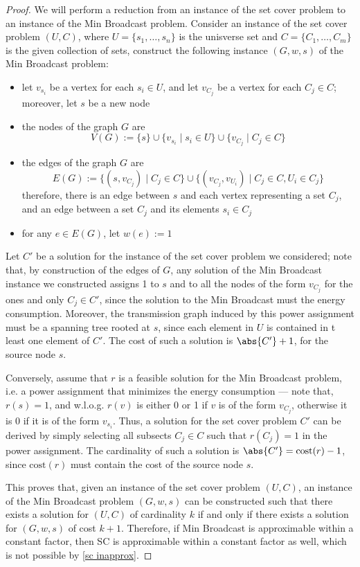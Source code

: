 \documentclass[a4paper, 12pt]{report}
\begin{document}
    \begin{proof}
        We will perform a reduction from an instance of the set cover problem to an instance of the Min Broadcast problem. Consider an instance of the set cover problem $(U, C)$, where $U = \{s_1, \ldots, s_n\}$ is the unisverse set and $C = \{C_1, \ldots, C_m\}$ is the given collection of sets, construct the following instance $(G, w, s)$ of the Min Broadcast problem:

        \begin{itemize}
            \item let $v_{s_i}$ be a vertex for each $s_i \in U$, and let $v_{C_j}$ be a vertex for each $C_j \in C$; moreover, let $s$ be a new node
            \item the nodes of the graph $G$ are $$V(G) := \{s\} \cup \{v_{s_i} \mid s_i \in U\} \cup \{v_{C_j} \mid C_j \in C\}$$
            \item the edges of the  graph $G$ are $$E(G) := \{(s, v_{C_j}) \mid C_j \in C\} \cup \{(v_{C_j}, v_{U_i}) \mid C_j \in C, U_i \in C_j\}$$ therefore, there is an edge between $s$ and each vertex representing a set $C_j$, and an edge between a set $C_j$ and its elements $s_i \in C_j$
            \item for any $e \in E(G)$, let $w(e) := 1$
        \end{itemize}
        
        Let $C'$ be a solution for the instance of the set cover problem we considered; note that, by construction of the edges of $G$, any solution of the Min Broadcast instance we constructed assigns 1 to $s$ and to all the nodes of the form $v_{C_j}$ for the ones and only $C_j \in C'$, since the solution to the Min Broadcast must  the energy consumption. Moreover, the transmission graph induced by this power assignment must be a spanning tree rooted at $s$, since each element in $U$ is contained in t least one element of $C'$. The cost of such a solution is $\abs{C'} + 1$, for the source node $s$.

        Conversely, assume that $r$ is a feasible solution for the Min Broadcast problem, i.e. a power assignment that minimizes the energy consumption --- note that, $r(s) = 1$, and w.l.o.g. $r(v)$ is either 0 or 1 if $v$ is of the form $v_{C_j}$, otherwise it is 0 if it is of the form $v_{s_i}$. Thus, a solution for the set cover problem $C'$ can be derived by simply selecting all subsects $C_j \in C$ such that $r(C_j) = 1$ in the power assignment. The cardinality of such a solution is $\abs{C'} = \mathrm{cost}(r) - 1$, since $\mathrm{cost}(r)$ must contain the cost of the source node $s$.

        This proves that, given an instance of the set cover problem $(U, C)$, an instance of the Min Broadcast problem $(G, w, s)$ can be constructed such that there exists a solution for $(U, C)$ of cardinality $k$ if and only if there exists a solution for $(G, w, s)$ of cost $k + 1$. Therefore, if Min Broadcast is approximable within a constant factor, then SC is approximable within a constant factor as well, which is not possible by \cref{sc inapprox}.
    \end{proof}
\end{document}
